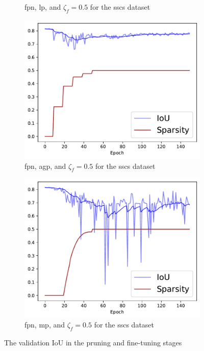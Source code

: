 \documentclass[mathematics,article,submit,pdftex,moreauthors]{Definitions/mdpi}
\begin{document}
\begin{figure}[!ht]
\begin{subfigure}[t]{.29\textwidth}
        \caption{\ac{fpn}, \ac{lp}, and $\zeta_f=0.5$ for the \ac{sscs} dataset}
        \label{fig:results:pruning:iou:fpn-lp-0.5-sscs}
      \end{subfigure}
      \hfill
      \begin{subfigure}[t]{.29\textwidth}
        \centering
        \includegraphics[width=.95\linewidth]{figures/pruning/fpn_agp_0.5_CCSCtraining_progress.pdf}
        \caption{\ac{fpn}, \ac{agp}, and $\zeta_f=0.5$ for the \ac{sscs} dataset}
        \label{fig:results:pruning:iou:fpn-agp-0.5-sscs}
      \end{subfigure}
      \hfill
      \begin{subfigure}[t]{.29\textwidth}
        \centering
        \includegraphics[width=.95\linewidth]{figures/pruning/fpn_movement_0.5_CCSCtraining_progress.pdf}
        \caption{\ac{fpn}, \ac{mp}, and $\zeta_f=0.5$ for the \ac{sscs} dataset}
        \label{fig:results:pruning:iou:fpn-mp-0.5-sscs}
      \end{subfigure}
      \caption{The validation IoU in the pruning and fine-tuning stages}
      \label{fig:results:pruning:iou}
\end{figure}
\end{document}
